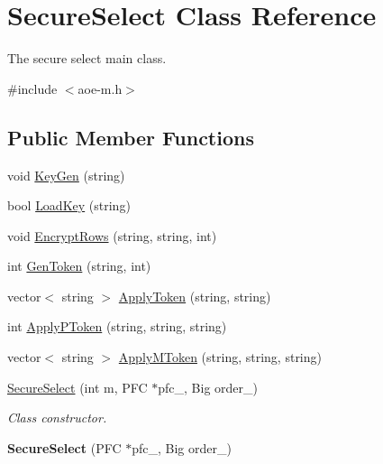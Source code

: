 \hypertarget{classSecureSelect}{}\section{Secure\+Select Class Reference}
\label{classSecureSelect}


The secure select main class.  




{\ttfamily \#include $<$aoe-\/m.\+h$>$}

\subsection*{Public Member Functions}
\begin{DoxyCompactItemize}
\item 
void \hyperlink{classSecureSelect_a72c8b1ac19619a6eeaa722f766e53b3f}{Key\+Gen} (string)
\item 
bool \hyperlink{classSecureSelect_ad7a2125393de550771e4e9177a1552b3}{Load\+Key} (string)
\item 
void \hyperlink{classSecureSelect_ada64a34744ec0598327f8e926c7fa2d6}{Encrypt\+Rows} (string, string, int)
\item 
int \hyperlink{classSecureSelect_a88e8f870930dfbeae24d355412b1d0a3}{Gen\+Token} (string, int)
\item 
vector$<$ string $>$ \hyperlink{classSecureSelect_a55312fbd535adba75ba328d060faff35}{Apply\+Token} (string, string)
\item 
int \hyperlink{classSecureSelect_aab33712ef6fbbe6922a2d8156b88dc27}{Apply\+P\+Token} (string, string, string)
\item 
vector$<$ string $>$ \hyperlink{classSecureSelect_a4b912c3407b0664ae37d2ccfce4eafc5}{Apply\+M\+Token} (string, string, string)
\item 
\hyperlink{classSecureSelect_a88cd629de7214c05eb86683b058bacd5}{Secure\+Select} (int m, P\+FC $\ast$pfc\+\_\+, Big order\+\_\+)
\begin{DoxyCompactList}\small\item\em Class constructor. \end{DoxyCompactList}\item 
{\bfseries Secure\+Select} (P\+FC $\ast$pfc\+\_\+, Big order\+\_\+)\hypertarget{classSecureSelect_a3270108d70fee40d40a28ebccee7ed2a}{}\label{classSecureSelect_a3270108d70fee40d40a28ebccee7ed2a}

\end{DoxyCompactItemize}
